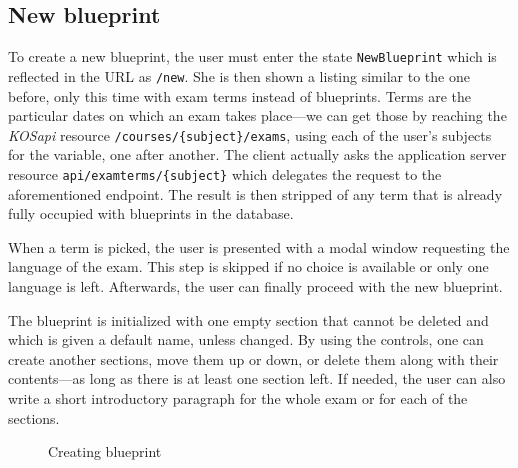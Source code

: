 \documentclass[thesis=M,english,hidelinks]{FITthesis}[2012/10/20]
\newcommand{\code}{\texttt}
\begin{document}
    \subsection{New blueprint}

To create a new blueprint, the user must enter the state \code{NewBlueprint} which is reflected in the URL as \code{/new}. She is then shown a listing similar to the one before, only this time with exam terms instead of blueprints. Terms are the particular dates on which an exam takes place---we can get those by reaching the \textit{KOSapi} resource \code{/courses/\{subject\}/exams}, using each of the user's subjects for the variable, one after another. The client actually asks the application server resource \code{api/examterms/\{subject\}} which delegates the request to the aforementioned endpoint. The result is then stripped of any term that is already fully occupied with blueprints in the database.

When a term is picked, the user is presented with a modal window requesting the language of the exam. This step is skipped if no choice is available or only one language is left. Afterwards, the user can finally proceed with the new blueprint.

The blueprint is initialized with one empty section that cannot be deleted and which is given a default name, unless changed. By using the controls, one can create another sections, move them up or down, or delete them along with their contents---as long as there is at least one section left. If needed, the user can also write a short introductory paragraph for the whole exam or for each of the sections.

\begin{figure}[h]
  \setlength\fboxsep{0pt}
  \setlength\fboxrule{0.2pt}
  \caption{Creating blueprint}
  \label{fig:new_blueprint}
\end{figure}
\end{document}
